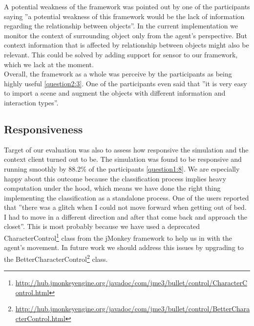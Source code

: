 A potential weakness of the framework was pointed out by one of the participants saying ''a potential weakness of this framework would be the lack of information regarding the relationship between objects''. In the current implementation we monitor the context of surrounding object only from the agent's perspective. But context information that is affected by relationship between objects might also be relevant. This could be solved by adding support for sensor to our framework, which we lack at the moment.\\

Overall, the framework as a whole was perceive by the participants as being highly useful \ref{question2:3}. One of the participants even said that ''it is very easy to import a scene and augment the objects with different information and interaction types''.\\

\subsection{Responsiveness} %
\label{sec:eval_responsiveness}
Target of our evaluation was also to assess how responsive the simulation and the context client turned out to be. The simulation was found to be responsive and running smoothly by 88.2\% of the participants \ref{question1:8}. We are especially happy about this outcome because the classification process implies heavy computation under the hood, which means we have done the right thing implementing the classification as a standalone process. One of the users reported that ''there was a glitch when I could not move forward when getting out of bed. I had to move in a different direction and after that come back and approach the closet''. This is most probably because we have used a deprecated CharacterControl\footnote{\url{http://hub.jmonkeyengine.org/javadoc/com/jme3/bullet/control/CharacterControl.html}} class from the jMonkey framework to help us in with the agent's movement. In future work we should address this issues by upgrading to the BetterCharacterControl\footnote{\url{http://hub.jmonkeyengine.org/javadoc/com/jme3/bullet/control/BetterCharacterControl.html}} class.\\

